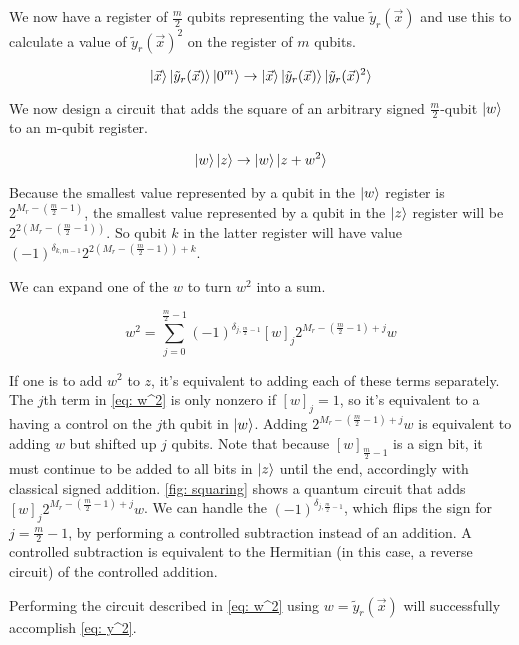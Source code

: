 We now have a register of $\frac{m}{2}$ qubits representing the value $\tilde{y}_r(\vec{x})$ and use this to calculate a value of $\tilde{y}_r(\vec{x})^2$ on the register of $m$ qubits.

\begin{equation}
    \ket{\vec{x}}\ket{\tilde{y}_r(\vec{x})}\ket{0^m} \rightarrow \ket{\vec{x}}\ket{\tilde{y}_r(\vec{x})}\ket{\tilde{y}_r(\vec{x})^2} \label{eq: y^2}
\end{equation}

We now design a circuit that adds the square of an arbitrary signed $\frac{m}{2}$-qubit $\ket{w}$ to an m-qubit register.

\begin{equation}
    \ket{w}\ket{z} \rightarrow \ket{w}\ket{z + w^2}
\end{equation}

Because the smallest value represented by a qubit in the $\ket{w}$ register is $2^{M_r - (\frac{m}{2} - 1)}$, the smallest value represented by a qubit in the $\ket{z}$ register will be $2^{2(M_r - (\frac{m}{2} - 1))}$. So qubit $k$ in the latter register will have value $(-1)^{\delta_{k, m - 1}}2^{2(M_r - (\frac{m}{2} - 1)) + k}$.

We can expand one of the $w$ to turn $w^2$ into a sum.

\begin{equation}
    w^2 = \sum_{j = 0}^{\frac{m}{2} - 1} (-1)^{\delta_{j, \frac{m}{2} - 1}}[w]_j2^{M_r - (\frac{m}{2} - 1) + j}w \label{eq: w^2}
\end{equation}

If one is to add $w^2$ to $z$, it's equivalent to adding each of these terms separately. The $j$th term in \eqref{eq: w^2} is only nonzero if $[w]_j = 1$, so it's equivalent to a having a control on the $j$th qubit in $\ket{w}$. Adding $2^{M_r - (\frac{m}{2} - 1) + j}w$ is equivalent to adding $w$ but shifted up $j$ qubits. Note that because $[w]_{\frac{m}{2} - 1}$ is a sign bit, it must continue to be added to all bits in $\ket{z}$ until the end, accordingly with classical signed addition. \ref{fig: squaring} shows a quantum circuit that adds $[w]_j2^{M_r - (\frac{m}{2} - 1) + j}w$.
We can handle the $(-1)^{\delta_{j, \frac{m}{2} - 1}}$, which flips the sign for $j = \frac{m}{2} - 1$, by performing a controlled subtraction instead of an addition. A controlled subtraction is equivalent to the Hermitian (in this case, a reverse circuit) of the controlled addition.

Performing the circuit described in \ref{eq: w^2} using $w = \tilde{y}_r(\vec{x})$ will successfully accomplish \ref{eq: y^2}.

